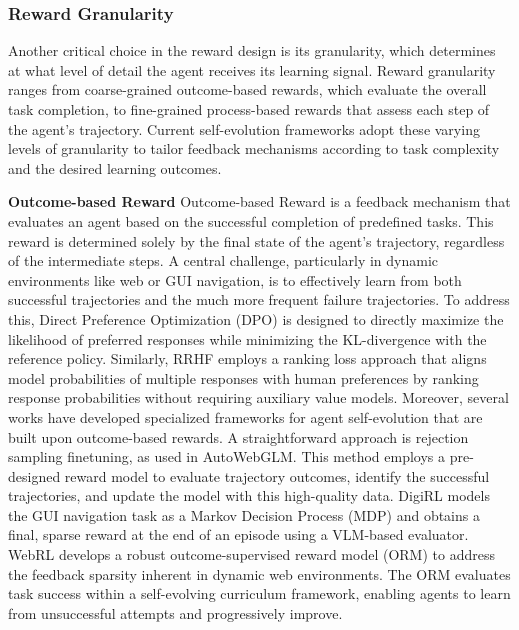 \subsubsection{Reward Granularity}

Another critical choice in the reward design is its granularity, which determines at what level of detail the agent receives its learning signal.
Reward granularity ranges from coarse-grained outcome-based rewards, which evaluate the overall task completion, to fine-grained process-based rewards that assess each step of the agent’s trajectory. Current self-evolution frameworks adopt these varying levels of granularity to tailor feedback mechanisms according to task complexity and the desired learning outcomes.

\textbf{Outcome-based Reward}
Outcome-based Reward is a feedback mechanism that evaluates an agent based on the successful completion of predefined tasks. This reward is determined solely by the final state of the agent’s trajectory, regardless of the intermediate steps. 
A central challenge, particularly in dynamic environments like web or GUI navigation, is to effectively learn from both successful trajectories and the much more frequent failure trajectories.
To address this, Direct Preference Optimization (DPO)\citep{rafailov2023direct} is designed to directly maximize the likelihood of preferred responses while minimizing the KL-divergence with the reference policy.
Similarly, RRHF\citep{yuan2023rrhf} employs a ranking loss approach that aligns model probabilities of multiple responses with human preferences by ranking response probabilities without requiring auxiliary value models.
Moreover, several works have developed specialized frameworks for agent self-evolution that are built upon outcome-based rewards.
A straightforward approach is rejection sampling finetuning, as used in AutoWebGLM\citep{lai2024autowebglm}. This method employs a pre-designed reward model to evaluate trajectory outcomes, identify the successful trajectories, and update the model with this high-quality data.
DigiRL\citep{bai2024digirl} models the GUI navigation task as a Markov Decision Process (MDP) and obtains a final, sparse reward at the end of an episode using a VLM-based evaluator.
WebRL\citep{qi2024webrl} develops a robust outcome-supervised reward model (ORM) to address the feedback sparsity inherent in dynamic web environments. The ORM evaluates task success within a self-evolving curriculum framework, enabling agents to learn from unsuccessful attempts and progressively improve.

